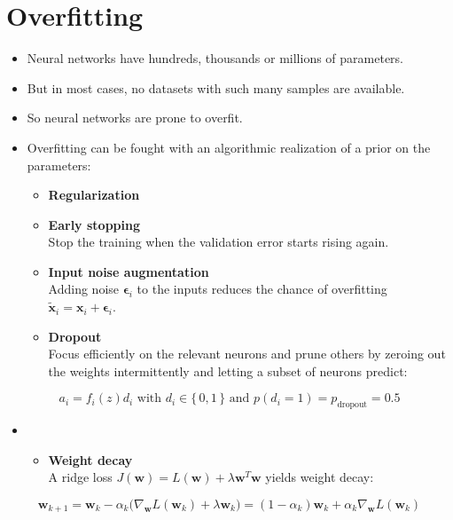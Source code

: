 \documentclass[a4paper, 11pt, accentcolor = tud3b]{tudreport}
\renewcommand{\vec}[1]{\mathbf{#1}}
\begin{document}
		\section{Overfitting}
			\begin{itemize}
				\item Neural networks have hundreds, thousands or millions of parameters.
				\item But in most cases, no datasets with such many samples are available.
				\item So neural networks are prone to overfit.
				\item Overfitting can be fought with an algorithmic realization of a prior on the parameters:
					\begin{itemize}
						\item \textbf{Regularization}
						\item \textbf{Early stopping} \\ Stop the training when the validation error starts rising again.
						\item \textbf{Input noise augmentation} \\ Adding noise \(\vec{\epsilon}_i\) to the inputs reduces the chance of overfitting \( \tilde{\vec{x}}_i = \vec{x}_i + \vec{\epsilon}_i \).
						\item \textbf{Dropout} \\ Focus efficiently on the relevant neurons and prune others by zeroing out the weights intermittently and letting a subset of neurons predict:
					\end{itemize}
			\end{itemize}
			\begin{equation}
				a_i = f_i(z) d_i \textrm{ with } d_i \in \{\, 0, 1 \,\} \textrm{ and } p(d_i = 1) = p_\textrm{dropout} = 0.5
			\end{equation}
			\begin{itemize}
				\item[]
					\begin{itemize}
						\item \textbf{Weight decay} \\ A ridge loss \( J(\vec{w}) = L(\vec{w}) + \lambda \vec{w}^T \vec{w} \) yields weight decay:
					\end{itemize}
			\end{itemize}
			\begin{equation}
				\vec{w}_{k + 1} = \vec{w}_k - \alpha_k \big( \nabla_{\vec{w}} L(\vec{w}_k) + \lambda \vec{w}_k \big) = (1 - \alpha_k) \vec{w}_k + \alpha_k \nabla_{\vec{w}} L(\vec{w}_k)
			\end{equation}
\end{document}

